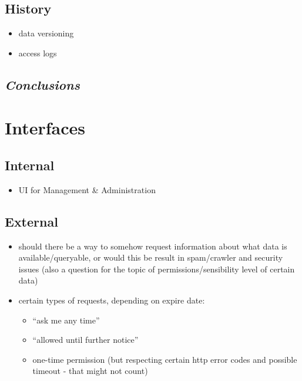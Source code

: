 \documentclass[12pt,english,a4paper,titlepage,cleardoublepage=empty,dottedtoc]{report}
\providecommand{\tightlist}{%
  \setlength{\itemsep}{0pt}\setlength{\parskip}{0pt}}
\begin{document}
\subsection{History}\label{history}

\begin{itemize}
\tightlist
\item
  data versioning
\item
  access logs
\end{itemize}

\subsection{\texorpdfstring{\emph{Conclusions}}{Conclusions}}\label{conclusions}

\section{Interfaces}\label{interfaces-1}

\subsection{Internal}\label{internal}

\begin{itemize}
\tightlist
\item
  UI for Management \& Administration
\end{itemize}

\subsection{External}\label{external}

\begin{itemize}
\item
  should there be a way to somehow request information about what data
  is available/queryable, or would this be result in spam/crawler and
  security issues (also a question for the topic of
  permissions/sensibility level of certain data)
\item
  certain types of requests, depending on expire date:

  \begin{itemize}
  \tightlist
  \item
    ``ask me any time''
  \item
    ``allowed until further notice''
  \item
    one-time permission (but respecting certain http error codes and
    possible timeout - that might not count)
  \end{itemize}
\end{itemize}
\end{document}
